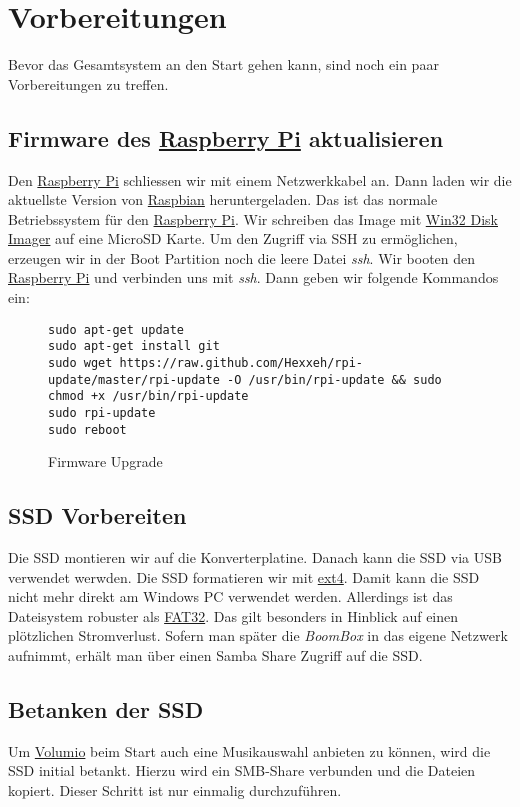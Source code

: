 \documentclass[12pt,a4paper]{article}
\newcommand{\bb}{\textit{BoomBox}}
\newcommand{\rpi}{\href{https://www.raspberrypi.org/}{Raspberry Pi}}
\newcommand{\vol}{\href{https://volumio.org/}{Volumio}}
\begin{document}
\newpage
\section{Vorbereitungen}
Bevor das Gesamtsystem an den Start gehen kann, sind noch ein paar Vorbereitungen zu treffen.

\subsection{Firmware des \rpi{} aktualisieren}
Den \rpi{} schliessen wir mit einem Netzwerkkabel an. Dann laden wir die aktuellste Version von \href{https://www.raspberrypi.org/downloads/raspbian/}{Raspbian}
heruntergeladen. Das ist das normale Betriebssystem für den \rpi{}. Wir schreiben das Image mit
\href{https://sourceforge.net/projects/win32diskimager/}{Win32 Disk Imager} auf eine MicroSD Karte. Um den Zugriff via SSH zu ermöglichen, erzeugen wir in der
Boot Partition noch die leere Datei \textit{ssh}. Wir booten den \rpi{} und verbinden uns mit \textit{ssh}. Dann geben wir folgende Kommandos ein:

\begin{figure}[H]
\begin{lstlisting}
sudo apt-get update
sudo apt-get install git
sudo wget https://raw.github.com/Hexxeh/rpi-update/master/rpi-update -O /usr/bin/rpi-update && sudo chmod +x /usr/bin/rpi-update
sudo rpi-update
sudo reboot
\end{lstlisting}
\caption{Firmware Upgrade}\label{fig:Firmware Upgrade}
\end{figure}

\newpage
\subsection{SSD Vorbereiten}
Die SSD montieren wir auf die Konverterplatine. Danach kann die SSD via USB verwendet werwden. Die SSD formatieren wir mit
\href{https://de.wikipedia.org/wiki/Ext4}{ext4}. Damit kann die SSD nicht mehr direkt am Windows PC verwendet werden. Allerdings ist das Dateisystem robuster
als \href{https://de.wikipedia.org/wiki/File_Allocation_Table#FAT32}{FAT32}. Das gilt besonders in Hinblick auf einen plötzlichen Stromverlust. Sofern man
später die \bb{} in das eigene Netzwerk aufnimmt, erhält man über einen Samba Share Zugriff auf die SSD.\@

\subsection{Betanken der SSD}\label{subsecc:Betanken der SSD}
Um \vol{} beim Start auch eine Musikauswahl anbieten zu können, wird die SSD initial betankt. Hierzu wird ein SMB-Share verbunden und die Dateien
kopiert. Dieser Schritt ist nur einmalig durchzuführen.
\end{document}
